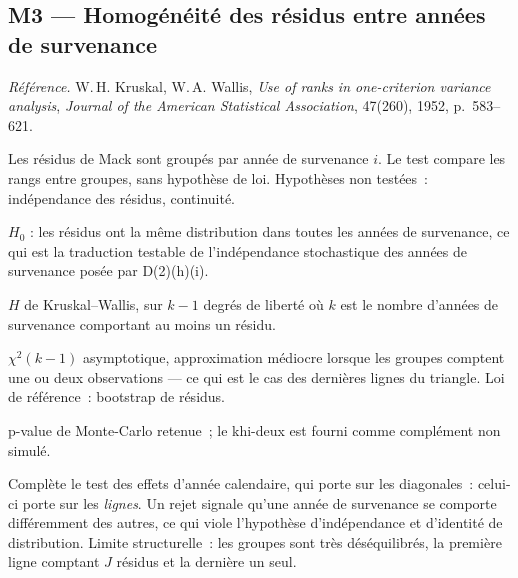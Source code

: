 \documentclass[a4paper,11pt]{article}
\newcommand{\refl}[1]{{\small\textcolor{maincolor!70!black}{\textit{Référence.} #1}}\par\smallskip}
\newcounter{ficheid}
\newenvironment{fiche}[1]{%
  \stepcounter{ficheid}%
  \phantomsection
  \subsection{#1}%
  \label{fiche:\theficheid}%
}{%
  \end{description}\vspace{0.5em}%
}
\newcommand{\Cadre}{%
  \begin{description}[leftmargin=0pt, style=unboxed, itemsep=3pt, topsep=3pt, parsep=2pt]%
  \item[\textcolor{financeblue}{\textbf{1. Cadre, notations et hypothèses de validité (non testées).}}]}
\newcommand{\Hzero}{\item[\textcolor{financeblue}{\textbf{2. Hypothèse nulle.}}]}
\newcommand{\Stat}{\item[\textcolor{financeblue}{\textbf{3. Statistique de test.}}]}
\newcommand{\Loi}{\item[\textcolor{financeblue}{\textbf{4. Loi sous $H_0$.}}]}
\newcommand{\Pval}{\item[\textcolor{financeblue}{\textbf{5. p-value.}}]}
\newcommand{\Usage}{\item[\textcolor{financeblue}{\textbf{6. Usage et limites.}}]}
\begin{document}
\begin{fiche}{M3 --- Homogénéité des résidus entre années de survenance}
\label{mw:m3acc}
\refl{W.\,H. Kruskal, W.\,A. Wallis, \emph{Use of ranks in one-criterion variance
analysis}, \emph{Journal of the American Statistical Association}, 47(260),
1952, p.~583--621.}
\Cadre
Les résidus de Mack sont groupés par année de survenance $i$. Le test compare
les rangs entre groupes, sans hypothèse de loi. Hypothèses non testées~:
indépendance des résidus, continuité.
\Hzero
$H_0$ : les résidus ont la même distribution dans toutes les années de
survenance, ce qui est la traduction testable de l'indépendance stochastique des
années de survenance posée par D(2)(h)(i).
\Stat
$H$ de Kruskal--Wallis, sur $k-1$ degrés de liberté où $k$ est le nombre
d'années de survenance comportant au moins un résidu.
\Loi
$\chi^2(k-1)$ asymptotique, approximation médiocre lorsque les groupes comptent
une ou deux observations --- ce qui est le cas des dernières lignes du triangle.
Loi de référence~: bootstrap de résidus.
\Pval
p-value de Monte-Carlo retenue~; le khi-deux est fourni comme complément non
simulé.
\Usage
Complète le test des effets d'année calendaire, qui porte sur les diagonales~:
celui-ci porte sur les \emph{lignes}. Un rejet signale qu'une année de
survenance se comporte différemment des autres, ce qui viole l'hypothèse
d'indépendance et d'identité de distribution. Limite structurelle~: les groupes
sont très déséquilibrés, la première ligne comptant $J$ résidus et la dernière
un seul.
\end{fiche}
\end{document}
